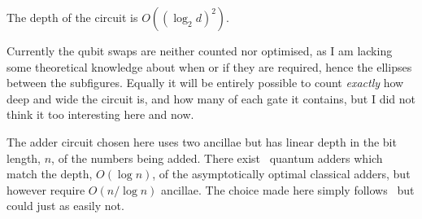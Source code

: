 \documentclass[notitlepage]{report}
\theoremstyle{definition}
\begin{document}
The depth of the circuit is $O\left({(\log_{2}d)}^{2}\right)$.

Currently the qubit swaps are neither counted nor optimised, as I am lacking some theoretical knowledge about when or if they are required, hence the ellipses between the subfigures. Equally it will be entirely possible to count \textit{exactly} how deep and wide the circuit is, and how many of each gate it contains, but I did not think it too interesting here and now.

The adder circuit chosen here uses two ancillae but has linear depth in the bit length, $n$, of the numbers being added. There exist~\cite{Takahashi:2008:FQC} quantum adders which match the depth, $O(\log n)$, of the asymptotically optimal classical adders, but however require $O(n/\log n)$ ancillae. The choice made here simply follows~\cite{SHA2} but could just as easily not.



\end{document}
